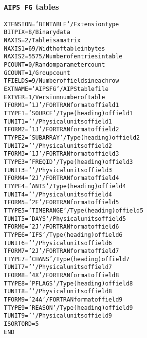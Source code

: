 \documentclass[twoside]{article}
\begin{document}
\subsubsection{{\tt AIPS FG} tables}
\label{Appe:FGtable}
\begin{alltt}
XTENSION= 'BINTABLE'           / Extension type
BITPIX  =                    8 / Binary data
NAXIS   =                    2 / Table is a matrix
NAXIS1  =                   69 / Width of table in bytes
NAXIS2  =                 5575 / Number of entries in table
PCOUNT  =                    0 / Random parameter count
GCOUNT  =                    1 / Group count
TFIELDS =                    9 / Number of fields in each row
EXTNAME = 'AIPS FG '           / AIPS table file
EXTVER  =                    1 / Version number of table
TFORM1  = '1J      '           / FORTRAN format of field  1
TTYPE1  = 'SOURCE          '   / Type (heading) of field  1
TUNIT1  = '        '           / Physical units of field  1
TFORM2  = '1J      '           / FORTRAN format of field  2
TTYPE2  = 'SUBARRAY        '   / Type (heading) of field  2
TUNIT2  = '        '           / Physical units of field  2
TFORM3  = '1J      '           / FORTRAN format of field  3
TTYPE3  = 'FREQ ID         '   / Type (heading) of field  3
TUNIT3  = '        '           / Physical units of field  3
TFORM4  = '2J      '           / FORTRAN format of field  4
TTYPE4  = 'ANTS            '   / Type (heading) of field  4
TUNIT4  = '        '           / Physical units of field  4
TFORM5  = '2E      '           / FORTRAN format of field  5
TTYPE5  = 'TIME RANGE      '   / Type (heading) of field  5
TUNIT5  = 'DAYS    '           / Physical units of field  5
TFORM6  = '2J      '           / FORTRAN format of field  6
TTYPE6  = 'IFS             '   / Type (heading) of field  6
TUNIT6  = '        '           / Physical units of field  6
TFORM7  = '2J      '           / FORTRAN format of field  7
TTYPE7  = 'CHANS           '   / Type (heading) of field  7
TUNIT7  = '        '           / Physical units of field  7
TFORM8  = '4X      '           / FORTRAN format of field  8
TTYPE8  = 'PFLAGS          '   / Type (heading) of field  8
TUNIT8  = '        '           / Physical units of field  8
TFORM9  = '24A     '           / FORTRAN format of field  9
TTYPE9  = 'REASON          '   / Type (heading) of field  9
TUNIT9  = '        '           / Physical units of field  9
ISORTORD=                   5
END
\end{alltt}
\end{document}
